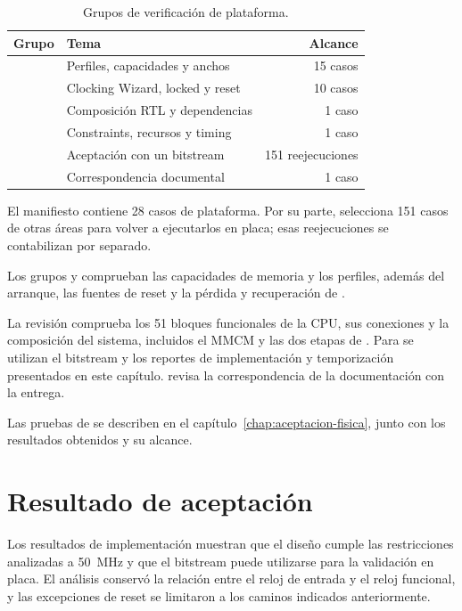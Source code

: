 \begin{table}[H]
  \centering
  \small
  \begin{tabularx}{\textwidth}{L{2.9cm}Yr}
    \toprule
    \textbf{Grupo} & \textbf{Tema} & \textbf{Alcance} \\
    \midrule
     & Perfiles, capacidades y anchos & 15 casos \\
     & Clocking Wizard, locked y reset & 10 casos \\
     & Composición RTL y dependencias & 1 caso \\
     & Constraints, recursos y timing & 1 caso \\
     & Aceptación con un bitstream & 151 reejecuciones \\
     & Correspondencia documental & 1 caso \\
    \bottomrule
  \end{tabularx}
  \caption{Grupos de verificación de plataforma.}
  \label{tab:casos-plataforma}
\end{table}

El manifiesto contiene 28 casos de plataforma. Por su parte,
 selecciona 151 casos de otras áreas para volver a
ejecutarlos en placa; esas reejecuciones se contabilizan por separado.

Los grupos  y  comprueban las
capacidades de memoria y los perfiles, además del arranque, las fuentes de
reset y la pérdida y recuperación de .

La revisión  comprueba los 51 bloques funcionales de la CPU,
sus conexiones y la composición del sistema, incluidos el MMCM y las dos etapas
de . Para
 se utilizan el bitstream y los reportes de implementación
y temporización presentados en este capítulo.  revisa la
correspondencia de la documentación con la entrega.

Las pruebas de  se describen en el
capítulo~\ref{chap:aceptacion-fisica}, junto con los resultados obtenidos y su
alcance.

\section{Resultado de aceptación}

Los resultados de implementación muestran que el diseño cumple las
restricciones analizadas a \SI{50}{\mega\hertz} y que el bitstream puede
utilizarse para la validación en placa. El análisis conservó la relación entre
el reloj de entrada y el reloj funcional, y las excepciones de reset se
limitaron a los caminos indicados anteriormente.
